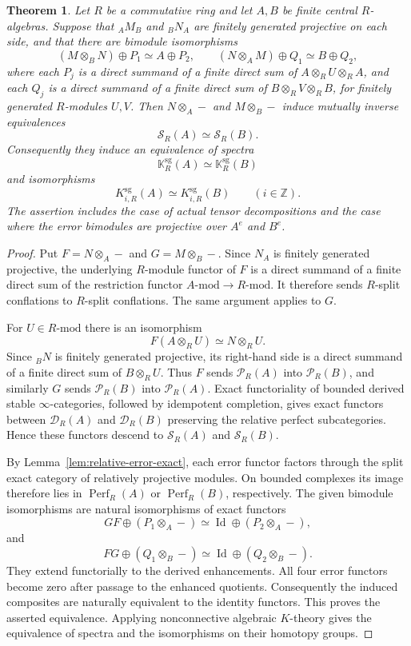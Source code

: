 \documentclass[12pt,a4paper,english,reqno]{amsart}
\numberwithin{equation}{section}
\theoremstyle{plain}
\newtheorem{theorem}{Theorem}[section]
\theoremstyle{definition}
\begin{document}
\begin{theorem}\label{thm:relative-singular-k-invariance}
Let $R$ be a commutative ring and let $A,B$ be finite central $R$-algebras. Suppose that
${}_AM_B$ and ${}_BN_A$ are finitely generated projective on each side,
and that there are bimodule isomorphisms
\[
 (M\otimes_BN)\oplus P_1\simeq A\oplus P_2,
 \qquad
 (N\otimes_AM)\oplus Q_1\simeq B\oplus Q_2,
\]
where each $P_j$ is a direct summand of a finite direct sum of
$A\otimes_R U\otimes_R A$, and each $Q_j$ is a direct summand of a
finite direct sum of $B\otimes_R V\otimes_R B$, for finitely generated
$R$-modules $U,V$. Then $N\otimes_A-$ and $M\otimes_B-$ induce mutually
inverse equivalences
\[
 \mathcal S_R(A)\simeq\mathcal S_R(B).
\]
Consequently they induce an equivalence of spectra
\[
 \mathbb K_R^{\mathrm{sg}}(A)\simeq\mathbb K_R^{\mathrm{sg}}(B)
\]
and isomorphisms
\[
 K^{\mathrm{sg}}_{i,R}(A)\simeq K^{\mathrm{sg}}_{i,R}(B)
 \qquad(i\in\mathbb Z).
\]
The assertion includes the case of actual tensor decompositions and
the case where the error bimodules are projective over $A^e$ and $B^e$.
\end{theorem}

\begin{proof}
Put $F=N\otimes_A-$ and $G=M\otimes_B-$. Since $N_A$ is finitely
generated projective, the underlying $R$-module functor of $F$ is a
direct summand of a finite direct sum of the restriction functor
$A\text{-}\mathrm{mod}\longrightarrow R\text{-}\mathrm{mod}$.
It therefore sends $R$-split conflations to $R$-split conflations.
The same argument applies to $G$.

For $U\in R\text{-}\mathrm{mod}$ there is an isomorphism
\[
 F(A\otimes_R U)\simeq N\otimes_R U.
\]
Since ${}_BN$ is finitely generated projective, its right-hand side
is a direct summand of a finite direct sum of $B\otimes_R U$.
Thus $F$ sends $\mathcal P_R(A)$ into $\mathcal P_R(B)$, and similarly
$G$ sends $\mathcal P_R(B)$ into $\mathcal P_R(A)$. Exact functoriality
of bounded derived stable $\infty$-categories, followed by idempotent
completion, gives exact functors between $\mathcal D_R(A)$ and
$\mathcal D_R(B)$ preserving the relative perfect subcategories.
Hence these functors descend to $\mathcal S_R(A)$ and
$\mathcal S_R(B)$.

By Lemma~\ref{lem:relative-error-exact}, each error functor factors
through the split exact category of relatively projective modules.
On bounded complexes its image therefore lies in
$\operatorname{Perf}_R(A)$ or $\operatorname{Perf}_R(B)$, respectively.
The given bimodule isomorphisms are natural isomorphisms of exact
functors
\[
 GF\oplus(P_1\otimes_A-)
 \simeq\operatorname{Id}\oplus(P_2\otimes_A-),
\]
and
\[
 FG\oplus(Q_1\otimes_B-)
 \simeq\operatorname{Id}\oplus(Q_2\otimes_B-).
\]
They extend functorially to the derived enhancements. All four error
functors become zero after passage to the enhanced quotients.
Consequently the induced composites are naturally equivalent to the
identity functors. This proves the asserted equivalence. Applying
nonconnective algebraic $K$-theory gives the equivalence of spectra
and the isomorphisms on their homotopy groups.
\end{proof}
\end{document}
